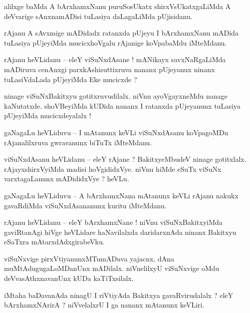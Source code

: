 \documentclass{article}
\begin{document}
\begin{mn}%
alilxge baMda A bArxhamxNanu puruSosUkatx shirxVsUkatxgaLiMda A deVvarige sAnxnamADisi tuLasiya 
daLagaLiMda pUjisidanu.
\end{mn}

\begin{mn}%
rAjanu A sAvxmige mADidadx ratanxda pUjeyu I bArxhamxNanu mADida tuLasiya pUjeyiMda mucicxhoVgalu 
rAjanige koVpabaMdu iMteMdanu.
\end{mn}

\begin{mn}%
rAjanu heVLidanu -- eleY viSuNxdAsane ! mANikayx savxNaRgaLiMda mADiruva cenAnxgi 
parxkAshisuttixruva nananx pUjeyanux ninanx tuLasiVdaLada pUjeyiMda Eke mucicxde ?
\end{mn}

\begin{mn}%
ninage viSuNxBakitxyu gotitxruvudilalx. niVnu ayoVgayxneMdu nanage kaNutatxde. shoVBeyiMda kUDida 
nananx I ratanxda pUjeyanunx tuLasiya pUjeyiMda mucicxdeyalalx !
\end{mn}

\begin{mn}%
gaNagaLu heVLiduvu -- I mAtanunx keVLi viSuNxdAsanu koVpagoMDu rAjanalilxruva gwravanunx biTuTx 
iMteMdanu.
\end{mn}

\begin{mn}%
viSuNxdAsanu heVLidanu -- eleY rAjane ? BakitxyeMbudeV ninage gotitxlalx. rAjayxshirxVyiMda madisi 
hoVgididxVye. niVnu hiMde eSuTx viSuNx varxtagaLanunx mADididxVye ? heVLu.
\end{mn}

\begin{mn}%
gaNagaLu heVLiduvu -- A bArxhamxNana mAtanunx keVLi rAjanu nakukx gavaRdiMda viSuNxdAsananunx 
kuritu iMteMdanu.
\end{mn}

\begin{mn}%
rAjanu heVLidanu -- eleY bArxhamxNane ! niVnu viSuNxBakitxyiMda gaviRtanAgi hiVge heVLidare 
haNavilalxda daridarxnAda ninanx Bakitxyu eSaTxra mAtarxdAdxgirabeVku.
\end{mn}

\begin{mn}%
viSuNxvige pirxVtiyanunxMTumADuva yajacnx, dAna muMtAdugugaLoMDanUnx mADilalx. niVnelilxyU 
viSuNxvige oMdu deVvasAthxnavanUnx kUDa kaTiTxsilalx.
\end{mn}

\begin{mn}%
iMtaha baDavanAda ninagU I riVtiyAda Bakitxya gavaRvirudalalx ? eleY bArxhamxNArirA ? niVvelalxrU 
I ga nananx mAtanunx keVLiri.
\end{mn}
\end{document}
